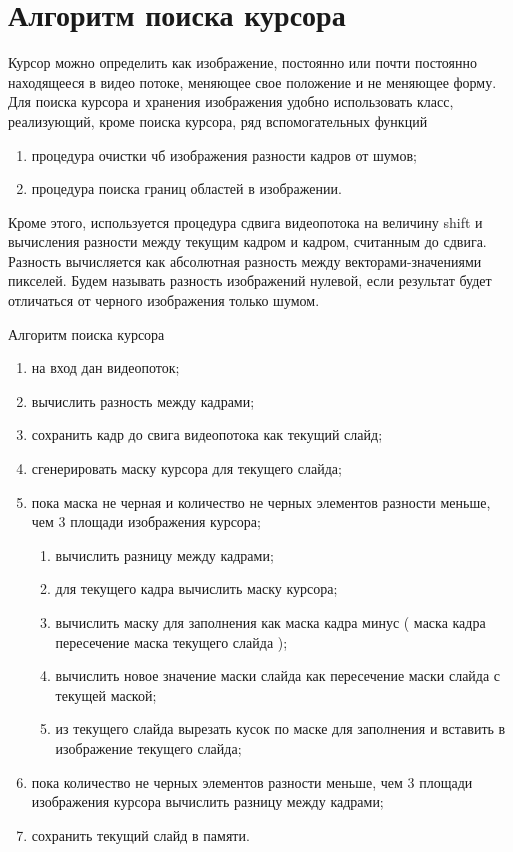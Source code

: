 \documentclass[oneside,final,14pt]{extreport}
\begin{document}
\section{Алгоритм поиска курсора}
Курсор можно определить как изображение, постоянно или почти постоянно находящееся в видео потоке, меняющее свое положение и не меняющее форму. Для поиска курсора и хранения изображения удобно использовать класс, реализующий, кроме поиска курсора, ряд вспомогательных функций

\begin{enumerate}
\item процедура очистки чб изображения разности кадров от шумов;
\item процедура поиска границ областей в изображении.
\end{enumerate}

Кроме этого, используется процедура сдвига  видеопотока на величину shift и вычисления разности между текущим кадром и кадром, считанным до сдвига.
Разность вычисляется как абсолютная разность между векторами-значениями пикселей. Будем называть разность изображений нулевой, если результат будет отличаться от черного изображения только шумом.

Алгоритм поиска курсора

\begin{enumerate}
\item на вход дан видеопоток;
\item вычислить  разность между кадрами;
\item сохранить кадр до свига видеопотока как текущий слайд;
\item сгенерировать маску курсора для текущего слайда;
\item пока маска не черная и количество не черных элементов разности меньше, чем 3 площади изображения курсора;
\begin{enumerate}
	\item вычислить разницу между кадрами;
	\item для текущего кадра вычислить маску курсора;
	\item вычислить маску для заполнения как маска кадра минус ( маска кадра пересечение маска текущего слайда );
	\item вычислить новое значение маски слайда как пересечение маски слайда с текущей маской;
	\item из текущего слайда вырезать кусок по маске для заполнения и вставить в изображение текущего слайда;
\end{enumerate}
\item пока количество не черных элементов разности меньше, чем 3 площади изображения курсора вычислить разницу между кадрами;
\item сохранить текущий слайд в памяти.
\end{enumerate}
\end{document}
